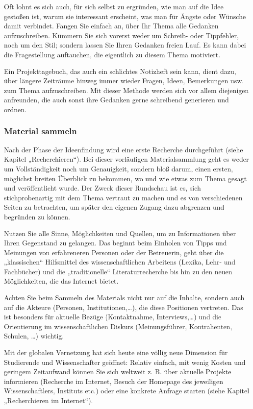 \documentclass[]{article}
\begin{document}
Oft lohnt es sich auch, für sich selbst zu ergründen, wie man auf die
Idee gestoßen ist, warum sie interessant erscheint, was man für Ängste
oder Wünsche damit verbindet. Fangen Sie einfach an, über Ihr Thema alle
Gedanken aufzuschreiben. Kümmern Sie sich vorerst weder um Schreib- oder
Tippfehler, noch um den Stil; sondern lassen Sie Ihren Gedanken freien
Lauf. Es kann dabei die Fragestellung auftauchen, die eigentlich zu
diesem Thema motiviert.

Ein Projekttagebuch, das auch ein schlichtes Notizheft sein kann, dient
dazu, über längere Zeiträume hinweg immer wieder Fragen, Ideen,
Bemerkungen usw. zum Thema aufzuschreiben. Mit dieser Methode werden
sich vor allem diejenigen anfreunden, die auch sonst ihre Gedanken gerne
schreibend generieren und ordnen.

\subsubsection{Material sammeln}\label{material-sammeln}

Nach der Phase der Ideenfindung wird eine erste Recherche durchgeführt
(siehe Kapitel „Recherchieren``). Bei dieser vorläufigen
Materialsammlung geht es weder um Vollständigkeit noch um Genauigkeit,
sondern bloß darum, einen ersten, möglichst breiten Überblick zu
bekommen, wo und wie etwas zum Thema gesagt und veröffentlicht wurde.
Der Zweck dieser Rundschau ist es, sich stichprobenartig mit dem Thema
vertraut zu machen und es von verschiedenen Seiten zu betrachten, um
später den eigenen Zugang dazu abgrenzen und begründen zu können.

Nutzen Sie alle Sinne, Möglichkeiten und Quellen, um zu Informationen
über Ihren Gegenstand zu gelangen. Das beginnt beim Einholen von Tipps
und Meinungen von erfahreneren Personen oder der Betreuerin, geht über
die „klassischen`` Hilfsmittel des wissenschaftlichen Arbeitens (Lexika,
Lehr- und Fachbücher) und die „traditionelle`` Literaturrecherche bis
hin zu den neuen Möglichkeiten, die das Internet bietet.

Achten Sie beim Sammeln des Materials nicht nur auf die Inhalte, sondern
auch auf die Akteure (Personen, Institutionen,\ldots{}), die diese
Positionen vertreten. Das ist besonders für aktuelle Bezüge
(Kontaktnahme, Interviews,\ldots{}) und die Orientierung im
wissenschaftlichen Diskurs (Meinungsführer, Kontrahenten, Schulen,
\ldots{}) wichtig.

Mit der globalen Vernetzung hat sich heute eine völlig neue Dimension
für Studierende und Wissenschafter geöffnet: Relativ einfach, mit wenig
Kosten und geringem Zeitaufwand können Sie sich weltweit z. B. über
aktuelle Projekte informieren (Recherche im Internet, Besuch der
Homepage des jeweiligen Wissenschaftlers, Instituts etc.) oder eine
konkrete Anfrage starten (siehe Kapitel „Recherchieren im Internet``).
\end{document}
